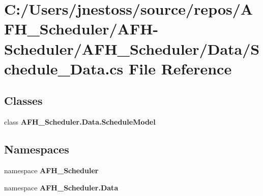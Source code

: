 \section{C\+:/\+Users/jnestoss/source/repos/\+A\+F\+H\+\_\+\+Scheduler/\+A\+F\+H-\/\+Scheduler/\+A\+F\+H\+\_\+\+Scheduler/\+Data/\+Schedule\+\_\+\+Data.cs File Reference}
\label{_schedule___data_8cs}
\subsection*{Classes}
\begin{DoxyCompactItemize}
\item 
class \textbf{ A\+F\+H\+\_\+\+Scheduler.\+Data.\+Schedule\+Model}
\end{DoxyCompactItemize}
\subsection*{Namespaces}
\begin{DoxyCompactItemize}
\item 
namespace \textbf{ A\+F\+H\+\_\+\+Scheduler}
\item 
namespace \textbf{ A\+F\+H\+\_\+\+Scheduler.\+Data}
\end{DoxyCompactItemize}
